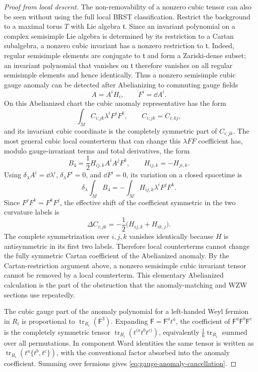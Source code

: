 \begin{proof}[Proof from local descent]
The non-removability of a nonzero cubic tensor can also be seen without using
the full local BRST classification.  Restrict the background to a maximal
torus \(T\) with Lie algebra \(\mathfrak t\).  Since an invariant polynomial
on a complex semisimple Lie algebra is determined by its restriction to a
Cartan subalgebra, a nonzero cubic invariant has a nonzero restriction to
\(\mathfrak t\).  Indeed, regular semisimple elements are conjugate to
\(\mathfrak t\) and form a Zariski-dense subset; an invariant polynomial that
vanishes on \(\mathfrak t\) therefore vanishes on all regular semisimple
elements and hence identically.  Thus a nonzero semisimple cubic gauge
anomaly can be detected after Abelianizing to commuting gauge fields
\[
  A=A^i H_i,\qquad F^i=\dd A^i .
\]
On this Abelianized chart the cubic anomaly representative has the form
\[
  \int_M C_{i;jk}\lambda^i F^jF^k,
  \qquad C_{i;jk}=C_{i;kj},
\]
and its invariant cubic coordinate is the completely symmetric part of
\(C_{i;jk}\).  The most general cubic local counterterm that can change this
\(\lambda F F\) coefficient has, modulo gauge-invariant terms and total
derivatives, the form
\[
  B_4
  =
  \frac12 H_{ij,k}A^iA^jF^k,
  \qquad H_{ij,k}=-H_{ji,k}.
\]
Using \(\delta_\lambda A^i=\dd\lambda^i\), \(\delta_\lambda F^i=0\), and
\(\dd F^i=0\), its variation on a closed spacetime is
\[
  \delta_\lambda\!\int_M B_4
  =
  -\int_M
  H_{ij,k}\lambda^i F^jF^k .
\]
Since \(F^jF^k=F^kF^j\), the effective shift of the coefficient symmetric in
the two curvature labels is
\[
  \Delta C_{i;jk}
  =
  -\frac12\bigl(H_{ij,k}+H_{ik,j}\bigr).
\]
The complete symmetrization over \(i,j,k\) vanishes identically because
\(H\) is antisymmetric in its first two labels.  Therefore local
counterterms cannot change the fully symmetric Cartan coefficient of the
Abelianized anomaly.  By the Cartan-restriction argument above, a nonzero
semisimple cubic invariant tensor cannot be removed by a local counterterm.
This elementary Abelianized calculation is the part of the obstruction that
the anomaly-matching and WZW sections use repeatedly.

The cubic gauge part of the anomaly polynomial for a left-handed Weyl fermion
in \(R_i\) is proportional to
\(\operatorname{tr}_{R_i}(\mathsf F^3)\).  Expanding
\(\mathsf F=\mathsf F^a t^a\), the coefficient of
\(\mathsf F^a\mathsf F^b\mathsf F^c\) is the completely symmetric tensor
\(\operatorname{tr}_{R_i}(t^{(a}t^b t^{c)})\), equivalently
\(\frac16\operatorname{tr}_{R_i}\) summed over all permutations.  In component
Ward identities the same tensor is written as
\(\operatorname{tr}_{R_i}(t^a\{t^b,t^c\})\), with the conventional factor
absorbed into the anomaly coefficient.  Summing over fermions gives
\eqref{eq:gauge-anomaly-cancellation}.


\end{proof}
